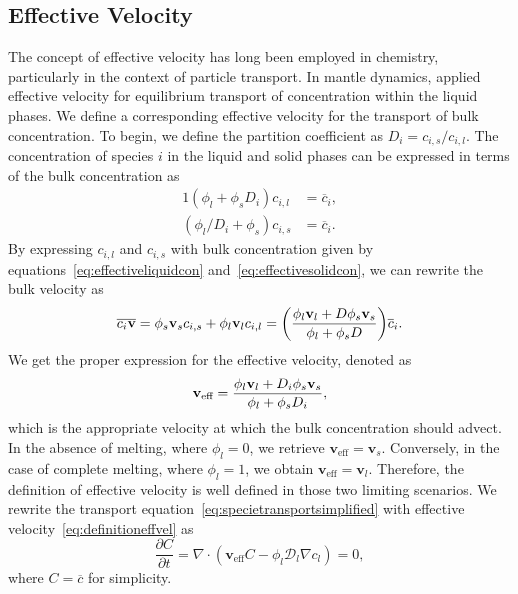 \subsection{Effective Velocity}
The concept of effective velocity has long been employed in chemistry, 
particularly in the context of particle transport. In mantle dynamics, 
\citet{GeochemicalConsequence} applied effective velocity for equilibrium 
transport of concentration within the liquid phases. We define a 
corresponding effective velocity for the transport of bulk concentration.
To begin, we define the partition coefficient as $D_i = c_{i,s}/c_{i,l}$. 
The concentration of species $i$ in the liquid and solid phases 
can be expressed in terms of the bulk concentration as 
\begin{alignat}{1}
		  \label{eq:effectiveliquidcon}
		  (\phi_l + \phi_s D_i) c_{i,l} &= \overline{c}_i, \\
		  \label{eq:effectivesolidcon}
		  (\phi_l/D_i + \phi_s) c_{i,s} &= \overline{c}_i. 
\end{alignat}
By expressing $c_{i,l}$ and $c_{i,s}$ with bulk concentration given by 
equations~\eqref{eq:effectiveliquidcon} and~\eqref{eq:effectivesolidcon}, 
we can rewrite the bulk velocity as
\begin{equation}
\label{eq:effectivevel}
		  \overline{c_{i}\bold{v}} = \phi_s \bold{v}_s c_{i,s} + \phi_l \bold{v}_l c_{i,l} = 
		  \bigg( \frac{\phi_l \bold{v}_l + D\phi_s \bold{v}_s}{\phi_l + \phi_s D} \bigg) \overline{c}_i.
\end{equation}
We get the proper expression for the effective velocity, denoted as 
\begin{equation}\label{eq:definitioneffvel}
\bold{v}_{\text{eff}} = \frac{\phi_l \bold{v}_l + D_i\phi_s \bold{v}_s}{\phi_l + \phi_s D_i},
\end{equation}
which is the appropriate velocity at which the bulk concentration should advect.
In the absence of melting, where $\phi_l = 0$, we retrieve 
$\mathbf{v}_{\text{eff}} = \mathbf{v}_s$.
Conversely, in the case of complete melting, where $\phi_l = 1$, we obtain
$\mathbf{v}_{\text{eff}} = \mathbf{v}_l$.
Therefore, the definition of effective velocity is well defined in those two limiting scenarios. 
We rewrite the transport equation~\eqref{eq:specietransportsimplified} with effective velocity~\eqref{eq:definitioneffvel} as
\begin{equation}\label{eq:effectivetransportspecie}
		  \frac{\partial C}{\partial t} = 
		  \nabla \cdot (\mathbf{v}_{\text{eff}} C - \phi_l \mathcal{D}_l \nabla c_l)
		  = 0,
\end{equation}
where $C = \overline{c}$ for simplicity.

